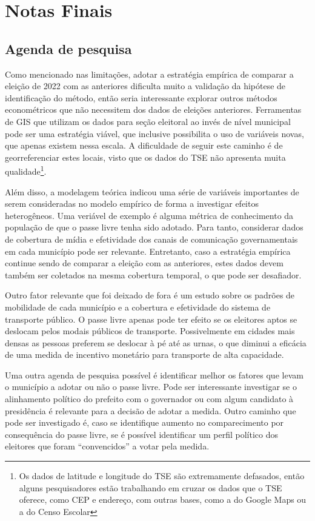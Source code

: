 \section{Notas Finais}

\subsection{Agenda de pesquisa}

Como mencionado nas limitações, adotar a estratégia empírica de comparar a eleição de 2022 com as anteriores dificulta muito a validação da hipótese de identificação do método, então seria interessante explorar outros métodos econométricos que não necessitem dos dados de eleições anteriores. Ferramentas de GIS que utilizam os dados para seção eleitoral ao invés de nível municipal pode ser uma estratégia viável, que inclusive possibilita o uso de variáveis novas, que apenas existem nessa escala. A dificuldade de seguir este caminho é de georreferenciar estes locais, visto que os dados do TSE não apresenta muita qualidade\footnote{Os dados de latitude e longitude do TSE são extremamente defasados, então alguns pesquisadores estão trabalhando em cruzar os dados que o TSE oferece, como CEP e endereço, com outras bases, como a do Google Maps ou a do Censo Escolar}. 

Além disso, a modelagem teórica indicou uma série de variáveis importantes de serem consideradas no modelo empírico de forma a investigar efeitos heterogêneos. Uma veriável de exemplo é alguma métrica de conhecimento da população de que o passe livre tenha sido adotado. Para tanto, considerar dados de cobertura de mídia e efetividade dos canais de comunicação governamentais em cada município pode ser relevante. Entretanto, caso a estratégia empírica continue sendo de comparar a eleição com as anteriores, estes dados devem também ser coletados na mesma cobertura temporal, o que pode ser desafiador. 

Outro fator relevante que foi deixado de fora é um estudo sobre os padrões de mobilidade de cada município e a cobertura e efetividade do sistema de transporte público. O passe livre apenas pode ter efeito se os eleitores aptos se deslocam pelos modais públicos de transporte. Possivelmente em cidades mais densas as pessoas preferem se deslocar à pé até as urnas, o que diminui a eficácia de uma medida de incentivo monetário para transporte de alta capacidade.

Uma outra agenda de pesquisa possível é identificar melhor os fatores que levam o município a adotar ou não o passe livre. Pode ser interessante investigar se o alinhamento político do prefeito com o governador ou com algum candidato à presidência é relevante para a decisão de adotar a medida. Outro caminho que pode ser investigado é, caso se identifique aumento no comparecimento por consequência do passe livre, se é possível identificar um perfil político dos eleitores que foram ``convencidos'' a votar pela medida.

